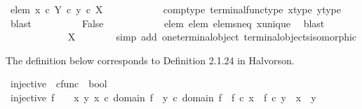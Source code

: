 \begin{isabellebody}
\ elem{}{\isacharcolon}{\kern0pt}\ {\isachardoublequoteopen}{\isacharparenleft}{\kern0pt}x\ {\isasymcirc}\isactrlsub c\ {\isasymbeta}\isactrlbsub Y\isactrlesub {\isacharparenright}{\kern0pt}\ {\isasymcirc}\isactrlsub c\ y\ {\isasymin}\isactrlsub c\ X{\isachardoublequoteclose}\isanewline
\ \ \ \ \ \ \ \ \ \ \isamarkupfalse%
\ comp{\isacharunderscore}{\kern0pt}type\ terminal{\isacharunderscore}{\kern0pt}func{\isacharunderscore}{\kern0pt}type\ x{\isacharunderscore}{\kern0pt}type\ y{\isacharunderscore}{\kern0pt}type\ \isamarkupfalse%
\ blast\isanewline
\ \ \ \ \ \ \ \ \isamarkupfalse%
\ False\isanewline
\ \ \ \ \ \ \ \ \ \ \isamarkupfalse%
\ elem{}\ elem{}\ elems{\isacharunderscore}{\kern0pt}neq\ x{\isacharunderscore}{\kern0pt}unique\ \isamarkupfalse%
\ blast\isanewline
\ \ \ \ \ \ \isamarkupfalse%
\isanewline
\ \ \ \ \isamarkupfalse%
\isanewline
\ \ \isamarkupfalse%
\isanewline
\ \ \isamarkupfalse%
\ \isamarkupfalse%
\ {\isachardoublequoteopen}X\ {\isasymcong}\ {\isasymone}{\isachardoublequoteclose}\isanewline
\ \ \ \ \isamarkupfalse%
\ {\isacharparenleft}{\kern0pt}simp\ add{\isacharcolon}{\kern0pt}\ one{\isacharunderscore}{\kern0pt}terminal{\isacharunderscore}{\kern0pt}object\ terminal{\isacharunderscore}{\kern0pt}objects{\isacharunderscore}{\kern0pt}isomorphic{\isacharparenright}{\kern0pt}\isanewline
{}\isamarkupfalse%
%
\endisatagproof
{\isafoldproof}%
%
\isadelimproof
%
\endisadelimproof
%
\isadelimdocument
%
\endisadelimdocument
%
\isatagdocument
%
\isamarkuptrue%
%
\endisatagdocument
{\isafolddocument}%
%
\isadelimdocument
%
\endisadelimdocument
%
\begin{isamarkuptext}%
The definition below corresponds to Definition 2.1.24 in Halvorson.%
\end{isamarkuptext}\isamarkuptrue%
\isamarkupfalse%
\ injective\ {\isacharcolon}{\kern0pt}{\isacharcolon}{\kern0pt}\ {\isachardoublequoteopen}cfunc\ {\isasymRightarrow}\ bool{\isachardoublequoteclose}\ \isanewline
\ {\isachardoublequoteopen}injective\ f\ \ {\isasymlongleftrightarrow}\ {\isacharparenleft}{\kern0pt}{\isasymforall}\ x\ y{\isachardot}{\kern0pt}\ {\isacharparenleft}{\kern0pt}x\ {\isasymin}\isactrlsub c\ domain\ f\ {\isasymand}\ y\ {\isasymin}\isactrlsub c\ domain\ f\ {\isasymand}\ f\ {\isasymcirc}\isactrlsub c\ x\ {\isacharequal}{\kern0pt}\ f\ {\isasymcirc}\isactrlsub c\ y{\isacharparenright}{\kern0pt}\ {\isasymlongrightarrow}\ x\ {\isacharequal}{\kern0pt}\ y{\isacharparenright}{\kern0pt}{\isachardoublequoteclose}\isanewline

\end{isabellebody}
